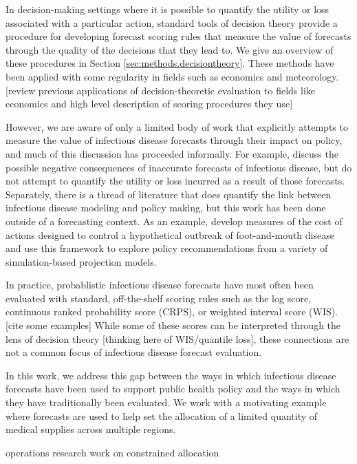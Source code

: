 \documentclass{article}
\begin{document}
In decision-making settings where it is possible to quantify the utility or loss associated with a particular action, standard tools of decision theory provide a procedure for developing forecast scoring rules that measure the value of forecasts through the quality of the decisions that they lead to. We give an overview of these procedures in Section \ref{sec:methods.decisiontheory}. These methods have been applied with some regularity in fields such as economics and meteorology. [review previous applications of decision-theoretic evaluation to fields like economics and high level description of scoring procedures they use]

However, we are aware of only a limited body of work that explicitly attempts to measure the value of infectious disease forecasts through their impact on policy, and much of this discussion has proceeded informally. For example, \cite{ioannidis2022forecastingCOVIDfailed} discuss the possible negative consequences of inaccurate forecasts of infectious disease, but do not attempt to quantify the utility or loss incurred as a result of those forecasts. Separately, there is a thread of literature that does quantify the link between infectious disease modeling and policy making, but this work has been done outside of a forecasting context. As an example, \cite{Probert2016decisionMakingFootMouth} develop measures of the cost of actions designed to control a hypothetical outbreak of foot-and-mouth disease and use this framework to explore policy recommendations from a variety of simulation-based projection models.

In practice, probablistic infectious disease forecasts have most often been evaluated with standard, off-the-shelf scoring rules such as the log score, continuous ranked probability score (CRPS), or weighted interval score (WIS). [cite some examples] While some of these scores can be interpreted through the lens of decision theory [thinking here of WIS/quantile loss], these connections are not a common focus of infectious disease forecast evaluation.

In this work, we address this gap between the ways in which infectious disease forecasts have been used to support public health policy and the ways in which they have traditionally been evaluated. We work with a motivating example where forecasts are used to help set the allocation of a limited quantity of medical supplies across multiple regions.

operations research work on constrained allocation
\end{document}
